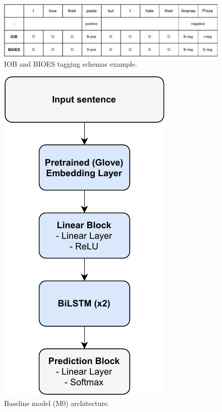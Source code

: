 \documentclass[11pt,a4paper]{article}
\begin{document}
	\begin{figure}[H]
		\centering
		\includegraphics[width=1\columnwidth]{IOB_BIOES_example.pdf}
		\caption{IOB and BIOES tagging schemas example.}
		\label{fig:IOB_BIOES}
	\end{figure}
	
	\begin{figure}[H]
		\centering
		\includegraphics[width=0.7\columnwidth]{M0_diagram.pdf}
		\caption{Baseline model (M0) architecture.}
		\label{fig:M0_architecture}
	\end{figure}
	
\end{document}
